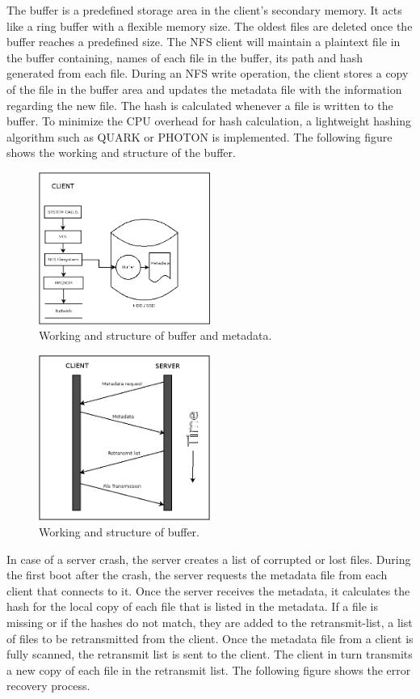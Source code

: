 \documentclass[conference]{IEEEtran}
\begin{document}
The buffer is a predefined storage area in the client's secondary memory.
It acts like a ring buffer with a flexible memory size. The oldest files are
deleted once the buffer reaches a predefined size. The NFS client will maintain
a plaintext file in the buffer containing, names of each file in the buffer,
its path and hash generated from each file. During an NFS write operation,
the client stores a copy of the file in the buffer area and updates the 
metadata file with the information regarding the  new file. The hash is
calculated whenever a file is written to the buffer. To minimize the CPU
overhead for hash calculation, a lightweight hashing algorithm such as QUARK
or PHOTON is implemented. The following figure shows the working and structure 
of the buffer.
\begin{figure}[htbp]
\centerline{\includegraphics[width=0.5\textwidth,natwidth=400,natheight=50]{fixing_server_async.png}}
\caption{Working and structure of buffer and metadata.}
\label{fig}
\end{figure}
\begin{figure}[htbp]
\centerline{\includegraphics[width=0.5\textwidth,natwidth=400,natheight=50]{error_recovery.png}}
\caption{Working and structure of buffer.}
\label{fig}
\end{figure}


In case of a server crash, the server creates a list of corrupted or lost
files. During the first boot after the crash, the server requests the
metadata file from each client that connects to it. Once the server receives
the metadata, it calculates the hash for the local copy of each file that
is listed in the metadata. If a file is missing or if the hashes do not
match, they are added to the retransmit-list, a list of files to be 
retransmitted from the client. Once the metadata file from a client is fully
scanned, the retransmit list is sent to the client. The client in turn
transmits a new copy of each file in the retransmit list. The following figure 
shows the error recovery process.
\end{document}
